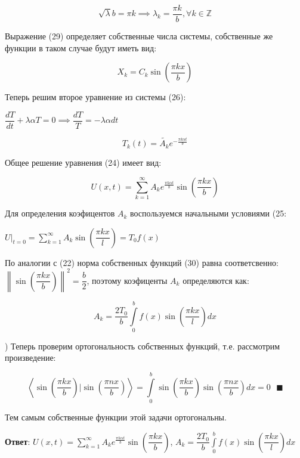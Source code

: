 \documentclass[a4paper, 12pt]{article}
\begin{document}
	\begin{equation}
		\sqrt{\lambda} b = \pi k \implies \lambda_k = \dfrac{\pi k }{b}, \forall k \in \mathbb{Z}
	\end{equation}
	
	\quad Выражение (29) определяет собственные числа системы, собственные же функции в таком случае будут иметь вид: 
	
	\begin{equation}
		X_k = C_k \sin\left(\dfrac{\pi k x}{b}\right) 
	\end{equation}
	
	\quad Теперь решим второе уравнение из системы (26):
	
	\begin{center}
		$\dfrac{dT}{dt} + \lambda \alpha T = 0 \implies \dfrac{dT}{T} = -\lambda \alpha dt$
	\end{center}
	
	\begin{equation}
		T_k(t) = \tilde{A_k} e^{-\frac{\pi k \alpha t}{b}}
	\end{equation}
	
	\quad Общее решение уравнения (24) имеет вид:
	
	\begin{equation}
		U(x, t) = \displaystyle\sum\limits_{k=1}^{\infty} A_k e^{\frac{\pi k \alpha t}{b}} \sin\left(\dfrac{\pi k x}{b}\right) 
	\end{equation}
	
	\quad Для определения коэфицентов $A_k$ воспользуемся начальными условиями (25:
	
	\begin{center}
		$U\bigg|_{t= 0} = \displaystyle\sum\limits_{k=1}^{\infty} A_k \sin\left(\dfrac{\pi k x}{l}\right) = T_0 f(x)$
	\end{center}
	
	\quad По аналогии с (22) норма собственных функций (30) равна соответсвенно: $\left\| \sin\left(\dfrac{\pi k x}{b}\right) \right\|^2 = \dfrac{b}{2}$, поэтому коэфиценты $A_k$ определяются как: 
	
	\begin{equation}
		A_k = \dfrac{2T_0 }{b} \displaystyle\int\limits_{0}^{b} f(x) \sin\left(\dfrac{\pi k x}{l}\right) dx 
	\end{equation}
	
	) Теперь проверим ортогональность собственных функций, т.е. рассмотрим произведение:
	
	\begin{equation}
		\left<\sin\left(\dfrac{\pi k x}{b}\right) | \sin\left(\dfrac{\pi n x}{b}\right)\right> = \displaystyle\int\limits_{0}^{b} \sin\left(\dfrac{\pi k x}{b}\right) \sin\left(\dfrac{\pi n x}{b}\right) dx = 0\text{ } \blacksquare 
	\end{equation}
	
	\quad Тем самым собственные функции этой задачи ортогональны. 
	
	\quad \textbf{Ответ}: $U(x, t) = \displaystyle\sum\limits_{k=1}^{\infty} A_k e^{\frac{\pi k \alpha t}{b}} \sin\left(\dfrac{\pi k x}{b}\right) $,  $A_k = \dfrac{2T_0 }{b} \displaystyle\int\limits_{0}^{b} f(x) \sin\left(\dfrac{\pi k x}{l}\right) dx $
	
	
\end{document}
